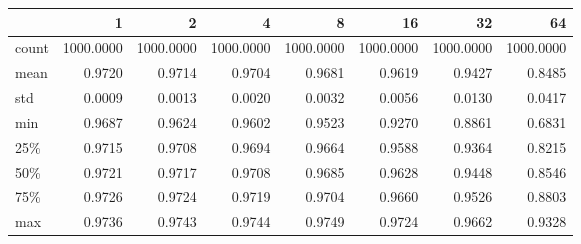 \begin{tabular}{lrrrrrrr}
\toprule
{} &         1  &         2  &         4  &         8  &         16 &         32 &         64 \\
\midrule
count &  1000.0000 &  1000.0000 &  1000.0000 &  1000.0000 &  1000.0000 &  1000.0000 &  1000.0000 \\
mean  &     0.9720 &     0.9714 &     0.9704 &     0.9681 &     0.9619 &     0.9427 &     0.8485 \\
std   &     0.0009 &     0.0013 &     0.0020 &     0.0032 &     0.0056 &     0.0130 &     0.0417 \\
min   &     0.9687 &     0.9624 &     0.9602 &     0.9523 &     0.9270 &     0.8861 &     0.6831 \\
25\%   &     0.9715 &     0.9708 &     0.9694 &     0.9664 &     0.9588 &     0.9364 &     0.8215 \\
50\%   &     0.9721 &     0.9717 &     0.9708 &     0.9685 &     0.9628 &     0.9448 &     0.8546 \\
75\%   &     0.9726 &     0.9724 &     0.9719 &     0.9704 &     0.9660 &     0.9526 &     0.8803 \\
max   &     0.9736 &     0.9743 &     0.9744 &     0.9749 &     0.9724 &     0.9662 &     0.9328 \\
\bottomrule
\end{tabular}
